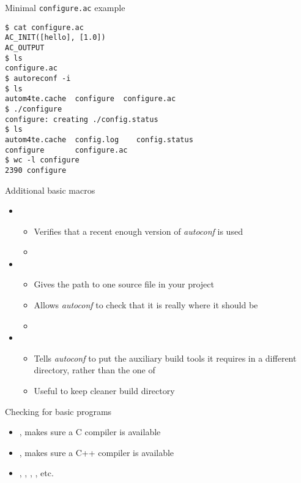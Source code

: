 \begin{frame}[fragile]{Minimal {\tt configure.ac} example}

  \begin{block}{}
    \begin{verbatim}
$ cat configure.ac
AC_INIT([hello], [1.0])
AC_OUTPUT
$ ls
configure.ac
$ autoreconf -i
$ ls
autom4te.cache  configure  configure.ac
$ ./configure
configure: creating ./config.status
$ ls
autom4te.cache  config.log    config.status
configure       configure.ac
$ wc -l configure
2390 configure
\end{verbatim}
\end{block}

\end{frame}

\begin{frame}{Additional basic macros}
  \begin{itemize}
  \item {}
    \begin{itemize}
    \item Verifies that a recent enough version of {\em autoconf} is used
    \item {}
    \end{itemize}
  \item {}
    \begin{itemize}
    \item Gives the path to one source file in your project
    \item Allows {\em autoconf} to check that it is really where it
      should be
    \item {}
    \end{itemize}
  \item {}
    \begin{itemize}
    \item Tells {\em autoconf} to put the auxiliary build tools it
      requires in a different directory, rather than the one of
    \item Useful to keep cleaner build directory
    \end{itemize}
  \end{itemize}
\end{frame}

\begin{frame}{Checking for basic programs}
  \begin{itemize}
  \item {}, makes sure a C compiler is available
  \item {}, makes sure a C++ compiler is available
  \item {}, , ,
    , etc.
  \end{itemize}
\end{frame}

